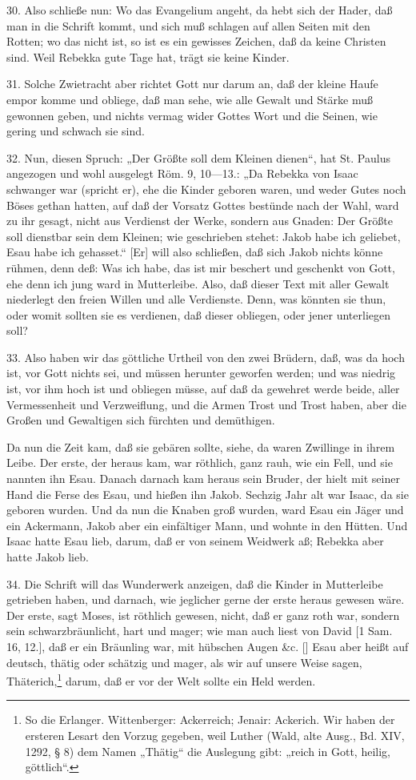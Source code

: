 30. Also schließe nun: Wo das Evangelium angeht, da hebt sich der Hader, daß man in die Schrift kommt, und sich muß schlagen auf allen Seiten mit den Rotten; wo das nicht ist, so ist es ein gewisses Zeichen, daß da keine Christen sind. Weil Rebekka gute Tage hat, trägt sie keine Kinder.

31. Solche Zwietracht aber richtet Gott nur darum an, daß der kleine Haufe empor komme und obliege, daß man sehe, wie alle Gewalt und Stärke muß gewonnen geben, und nichts vermag wider Gottes Wort und die Seinen, wie gering und schwach sie sind.

32. Nun, diesen Spruch: „Der Größte soll dem Kleinen dienen“, hat St. Paulus angezogen und wohl ausgelegt Röm. 9, 10—13.: „Da Rebekka von Isaac schwanger war (spricht er), ehe die Kinder geboren waren, und weder Gutes noch Böses gethan hatten, auf daß der Vorsatz Gottes bestünde nach der Wahl, ward zu ihr gesagt, nicht aus Verdienst der Werke, sondern aus Gnaden: Der Größte soll dienstbar sein dem Kleinen; wie geschrieben stehet: Jakob habe ich geliebet, Esau habe ich gehasset.“ [Er] will also schließen, daß sich Jakob nichts könne rühmen, denn deß: Was ich habe, das ist mir beschert und geschenkt von Gott, ehe denn ich jung ward in Mutterleibe. Also, daß dieser Text mit aller Gewalt niederlegt den freien Willen und alle Verdienste. Denn, was könnten sie thun, oder womit sollten sie es verdienen, daß dieser obliegen, oder jener unterliegen soll?

33. Also haben wir das göttliche Urtheil von den zwei Brüdern, daß, was da hoch ist, vor Gott nichts sei, und müssen herunter geworfen werden; und was niedrig ist, vor ihm hoch ist und obliegen müsse, auf daß da gewehret werde beide, aller Vermessenheit und Verzweiflung, und die Armen Trost und Trost haben, aber die Großen und Gewaltigen sich fürchten und demüthigen.

Da nun die Zeit kam, daß sie gebären sollte, siehe, da waren Zwillinge in ihrem Leibe. Der erste, der heraus kam, war röthlich, ganz rauh, wie ein Fell, und sie nannten ihn Esau. Danach darnach kam heraus sein Bruder, der hielt mit seiner Hand die Ferse des Esau, und hießen ihn Jakob. Sechzig Jahr alt war Isaac, da sie geboren wurden. Und da nun die Knaben groß wurden, ward Esau ein Jäger und ein Ackermann, Jakob aber ein einfältiger Mann, und wohnte in den Hütten. Und Isaac hatte Esau lieb, darum, daß er von seinem Weidwerk aß; Rebekka aber hatte Jakob lieb.

34. Die Schrift will das Wunderwerk anzeigen, daß die Kinder in Mutterleibe getrieben haben, und darnach, wie jeglicher gerne der erste heraus gewesen wäre. Der erste, sagt Moses, ist röthlich gewesen, nicht, daß er ganz roth war, sondern sein schwarzbräunlicht, hart und mager; wie man auch liest von David [1 Sam. 16, 12.], daß er ein Bräunling war, mit hübschen Augen \&c. [] Esau aber heißt auf deutsch, thätig oder schätzig und mager, als wir auf unsere Weise sagen, Thäterich,\footnote{So die Erlanger. Wittenberger: Ackerreich; Jenair: Ackerich. Wir haben der ersteren Lesart den Vorzug gegeben, weil Luther (Wald, alte Ausg., Bd. XIV, 1292, § 8) dem Namen „Thätig“ die Auslegung gibt: „reich in Gott, heilig, göttlich“.} darum, daß er vor der Welt sollte ein Held werden.

